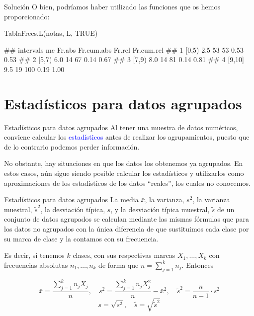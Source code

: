 \documentclass[
  ignorenonframetext,
  aspectratio=169]{beamer}
\newenvironment{Shaded}{\begin{snugshade}}{\end{snugshade}}
\newcommand{\ConstantTok}[1]{\textcolor[rgb]{0.00,0.00,0.00}{#1}}
\newcommand{\FunctionTok}[1]{\textcolor[rgb]{0.00,0.00,0.00}{#1}}
\newcommand{\NormalTok}[1]{#1}
\let\oldverbatim\verbatim
\let\endoldverbatim\endverbatim
\renewenvironment{verbatim}{\tiny\oldverbatim}{\endoldverbatim}
\newcommand\blue[1]{\textcolor{blue}{#1}}
\begin{document}
\begin{frame}[fragile]{Solución}
\protect\hypertarget{soluciuxf3n-29}{}
O bien, podríamos haber utilizado las funciones que os hemos
proporcionado:

\begin{Shaded}
\begin{Highlighting}[]
\FunctionTok{TablaFrecs.L}\NormalTok{(notas, L, }\ConstantTok{TRUE}\NormalTok{)}
\end{Highlighting}
\end{Shaded}

\begin{verbatim}
##   intervals  mc Fr.abs Fr.cum.abs Fr.rel Fr.cum.rel
## 1     [0,5) 2.5     53         53   0.53       0.53
## 2     [5,7) 6.0     14         67   0.14       0.67
## 3     [7,9) 8.0     14         81   0.14       0.81
## 4    [9,10] 9.5     19        100   0.19       1.00
\end{verbatim}
\end{frame}

\hypertarget{estaduxedsticos-para-datos-agrupados}{%
\section{Estadísticos para datos
agrupados}\label{estaduxedsticos-para-datos-agrupados}}

\begin{frame}{Estadísticos para datos agrupados}
\protect\hypertarget{estaduxedsticos-para-datos-agrupados-1}{}
Al tener una muestra de datos numéricos, conviene calcular los
\blue{ estadísticos } antes de realizar los agrupamientos, puesto que de
lo contrario podemos perder información.

No obstante, hay situaciones en que los datos los obtenemos ya
agrupados. En estos casos, aún sigue siendo posible calcular los
estadísticos y utilizarlos como aproximaciones de los estadísticos de
los datos ``reales'', los cuales no conocemos.
\end{frame}

\begin{frame}{Estadísticos para datos agrupados}
\protect\hypertarget{estaduxedsticos-para-datos-agrupados-2}{}
La media \(\bar{x}\), la varianza, \(s^2\), la varianza muestral,
\(\tilde{s}^2\), la desviación típica, \(s\), y la desviación típica
muestral, \(\tilde{s}\) de un conjunto de datos agrupados se calculan
mediante las mismas fórmulas que para los datos no agrupados con la
única diferencia de que sustituimos cada clase por su marca de clase y
la contamos con su frecuencia.

Es decir, si tenemos \(k\) clases, con sus respectivas marcas
\(X_1,\dots,X_k\) con frecuencias absolutas \(n_1,\dots,n_k\) de forma
que \(n=\sum_{j=1}^kn_j\). Entonces

\[\bar{x}=\frac{\sum_{j=1}^kn_jX_j}{n},\quad s^2=\frac{\sum_{j=1}^kn_jX_j^2}{n}-\bar{x}^2,\quad \tilde{s}^2=\frac{n}{n-1}\cdot s^2\]
\[s=\sqrt{s^2},\quad \tilde{s}=\sqrt{\tilde{s}^2}\]
\end{frame}
\end{document}

